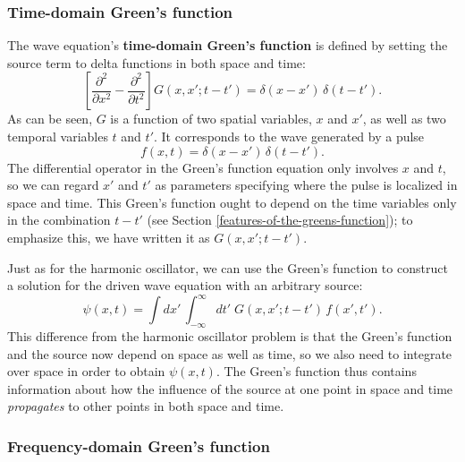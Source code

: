 \documentclass[10pt,a4paper]{article}
\begin{document}
\subsubsection{Time-domain Green's function}
\label{time-domain-greens-function}

The wave equation's \textbf{time-domain Green's function} is defined
by setting the source term to delta functions in both space and time:
\begin{equation}
\left[\frac{\partial^2}{\partial x^2} - \frac{\partial^2}{\partial t^2} \right] G(x,x';t-t') = \delta(x-x')\, \delta(t-t').
\end{equation}
As can be seen, $G$ is a function of two spatial variables, $x$ and
$x'$, as well as two temporal variables $t$ and $t'$. It
corresponds to the wave generated by a pulse
\begin{equation}
f(x,t) = \delta(x-x')\,\delta(t-t').
\end{equation}
The differential operator in the Green's function equation only
involves $x$ and $t$, so we can regard $x'$ and $t'$ as parameters
specifying where the pulse is localized in space and time. This
Green's function ought to depend on the time variables only in the
combination $t-t'$ (see Section
\ref{features-of-the-greens-function}); to emphasize this, we have
written it as $G(x,x';t-t')$.

Just as for the harmonic oscillator, we can use the Green's function to
construct a solution for the driven wave equation with an arbitrary
source:
\begin{equation}
\psi(x,t) = \int dx' \,\int_{-\infty}^\infty dt'\; G(x,x';t-t') \, f(x', t').
\end{equation}
This difference from the harmonic oscillator problem is that the Green's
function and the source now depend on space as well as time, so we also
need to integrate over space in order to obtain $\psi(x,t)$. The
Green's function thus contains information about how the influence of
the source at one point in space and time \emph{propagates} to other
points in both space and time.

\subsubsection{Frequency-domain Green's function}
\label{frequency-domain-greens-function}
\end{document}
